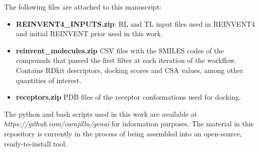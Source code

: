 The following files are attached to this manuscript:
\begin{itemize}
    \item \textbf{REINVENT4\_INPUTS.zip}: RL and TL input files used in REINVENT4 and initial REINVENT prior used in this work.
    \item \textbf{reinvent\_molecules.zip} CSV files with the SMILES codes of the compounds that passed the first filter at each iteration of the workflow. Contains RDkit descriptors, docking scores and CSA values, among other quantities of interest.
    \item \textbf{receptors.zip} PDB files of the receptor conformations used for docking.
\end{itemize}

The python and bash scripts used in this work are available at \textit{https://github.com/carajillu/genai} for information purposes. The material in this repository is currently in the process of being assembled into an open-source, ready-to-install tool.
